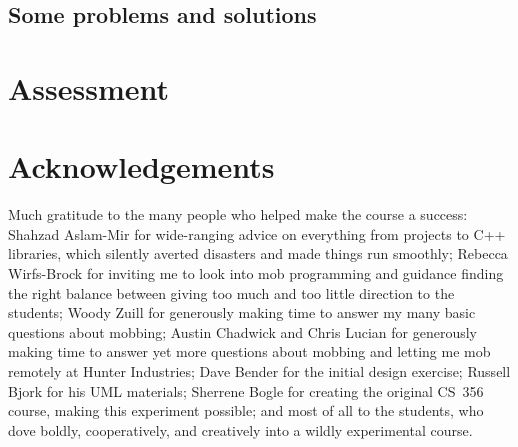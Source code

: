 \documentclass{article}
\begin{document}
\begin{comment}
Semester overview (put this in a small table).

Link to the complete syllabus.

``Software design'' is a highly ambiguous term. 

``common knowledge''

In an ordinary class, I would have demo'ed how to implement the finite state
machine, projecting my computer's screen to the whole class. Instead, we did
our first mob programming.

The day I improvised a lecture on agile vs. waterfall. Previous exposure had
given some students the impression that agile is hopelessly high-risk
because it has no discipline and other
students the impression that waterfall is hopelessly high-risk because it's
inflexible and assumes perfect forethought.

Some students had previous experience with Git and some did not.

No textbooks.

Hard to teach, easy to teach.

Danger: what if a prima donna shows up?

Finding a room

Problems: Not enough mobbing hours in the semester. A true community of
practice would meet nearly every day.
\end{comment}

\subsection{Some problems and solutions}

\section{Assessment}

\section{Acknowledgements}

Much gratitude to the many people who helped make the course a success:
Shahzad Aslam-Mir for wide-ranging advice on everything from projects to C++
libraries, which silently
averted disasters and made things run smoothly;
Rebecca Wirfs-Brock for inviting me to look into mob programming and guidance
finding the right balance between giving too much and too little direction
to the students;
Woody Zuill for generously making time to answer my many basic questions
about mobbing;
Austin Chadwick and Chris Lucian for generously making time to answer yet more
questions about mobbing and letting me mob remotely at Hunter Industries;
Dave Bender for the initial design exercise;
Russell Bjork for his UML materials;
Sherrene Bogle for creating the original CS~356 course, making this experiment
possible;
and most of all to the students, who dove boldly, cooperatively, and
creatively into a wildly experimental course.
\end{document}
